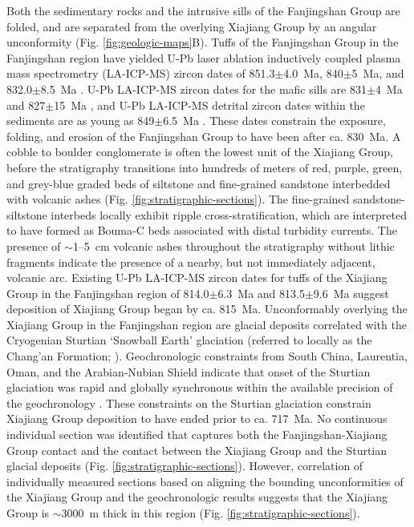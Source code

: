 Both the sedimentary rocks and the intrusive sills of the Fanjingshan Group are folded, and are separated from the overlying Xiajiang Group by an angular unconformity (Fig. \ref{fig:geologic-maps}B). Tuffs of the Fanjingshan Group in the Fanjingshan region have yielded U-Pb laser ablation inductively coupled plasma mass spectrometry (LA-ICP-MS) zircon dates of 851.3$\pm$4.0~Ma, 840$\pm$5~Ma, and 832.0$\pm$8.5~Ma \citep{Wang2012d, Gao2014a}. U-Pb LA-ICP-MS zircon dates for the mafic sills are 831$\pm$4~Ma and 827$\pm$15~Ma \citep{Zhao2011a}, and U-Pb LA-ICP-MS detrital zircon dates within the sediments are as young as 849$\pm$6.5~Ma \citep{Zhao2011a}. These dates constrain the exposure, folding, and erosion of the Fanjingshan Group to have been after ca. 830~Ma. A cobble to boulder conglomerate is often the lowest unit of the Xiajiang Group, before the stratigraphy transitions into hundreds of meters of red, purple, green, and grey-blue graded beds of siltstone and fine-grained sandstone interbedded with volcanic ashes (Fig. \ref{fig:stratigraphic-sections}). The fine-grained sandstone-siltstone interbeds locally exhibit ripple cross-stratification, which are interpreted to have formed as Bouma-C beds associated with distal turbidity currents. The presence of $\sim$1--5~cm volcanic ashes throughout the stratigraphy without lithic fragments indicate the presence of a nearby, but not immediately adjacent, volcanic arc. Existing U-Pb LA-ICP-MS zircon dates for tuffs of the Xiajiang Group in the Fanjingshan region of 814.0$\pm$6.3~Ma and 813.5$\pm$9.6~Ma \citep{Gao2010a, Gao2014a} suggest deposition of Xiajiang Group began by ca. 815~Ma. Unconformably overlying the Xiajiang Group in the Fanjingshan region are glacial deposits correlated with the Cryogenian Sturtian `Snowball Earth' glaciation (referred to locally as the Chang'an Formation; \citealp{Zhang2011a}). Geochronologic constraints from South China, Laurentia, Oman, and the Arabian-Nubian Shield indicate that onset of the Sturtian glaciation was rapid and globally synchronous within the available precision of the geochronology \citep{Bowring2007a, Macdonald2010a, MacLennan2018a, Lan2020a}. These constraints on the Sturtian glaciation constrain Xiajiang Group deposition to have ended prior to ca. 717~Ma. No continuous individual section was identified that captures both the Fanjingshan-Xiajiang Group contact and the contact between the Xiajiang Group and the Sturtian glacial deposits (Fig. \ref{fig:stratigraphic-sections}). However, correlation of individually measured sections based on aligning the bounding unconformities of the Xiajiang Group and the geochronologic results suggests that the Xiajiang Group is $\sim$3000~m thick in this region (Fig. \ref{fig:stratigraphic-sections}).

